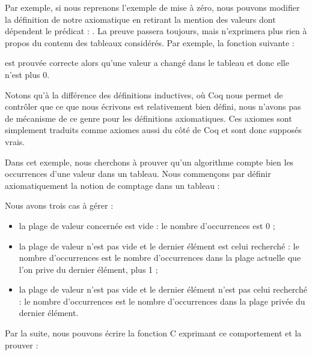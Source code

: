 Par exemple, si nous reprenons l'exemple de mise à zéro, nous pouvons modifier
la définition de notre axiomatique en retirant la mention des valeurs dont
dépendent le prédicat : . La preuve passera toujours,
mais n'exprimera plus rien à propos du contenu des tableaux considérés.
Par exemple, la fonction suivante :




est prouvée correcte alors qu'une valeur a changé dans le tableau et donc elle
n'est plus 0.


Notons qu'à la différence des définitions inductives, où Coq nous permet de contrôler
que ce que nous écrivons est relativement bien défini, nous n'avons pas de mécanisme
de ce genre pour les définitions axiomatiques. Ces axiomes sont simplement traduits
comme axiomes aussi du côté de Coq et sont donc supposés vrais.





Dans cet exemple, nous cherchons à prouver qu'un algorithme compte bien les
occurrences d'une valeur dans un tableau. Nous commençons par définir
axiomatiquement la notion de comptage dans un tableau :





Nous avons trois cas à gérer :



\begin{itemize}
\item la plage de valeur concernée est vide : le nombre d'occurrences est 0 ;
\item la plage de valeur n'est pas vide et le dernier élément est celui recherché :
le nombre d'occurrences est le nombre d'occurrences dans la plage actuelle que
l'on prive du dernier élément, plus 1 ;
\item la plage de valeur n'est pas vide et le dernier élément n'est pas celui
recherché : le nombre d'occurrences est le nombre d'occurrences dans la plage
privée du dernier élément.
\end{itemize}


Par la suite, nous pouvons écrire la fonction C exprimant ce comportement et la
prouver :






